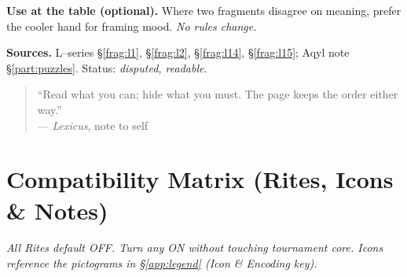\documentclass[11pt]{article}
\numberwithin{equation}{section} %
\theoremstyle{plain} %
\theoremstyle{definition} %
\theoremstyle{remark} %
\begin{document}
\medskip
\noindent\textbf{Use at the table (optional).} Where two fragments disagree on meaning, prefer the cooler hand for framing mood. \emph{No rules change.}

\medskip
\noindent\textbf{Sources.} L–series \S\ref{frag:l1}, \S\ref{frag:l2}, \S\ref{frag:l14}, \S\ref{frag:l15}; Aqyl note \S\ref{part:puzzles}. Status: \emph{disputed, readable}.


\begin{quote}\small
“Read what you can; hide what you must. The page keeps the order either way.”\\
\hfill — \textit{Lexicus}, note to self
\end{quote}
\clearpage
\appendix

\section{Compatibility Matrix (Rites, Icons \& Notes)}
\label{app:compat}

\noindent\textit{All Rites default \textsc{OFF}. Turn any \textsc{ON} without touching tournament core. Icons reference the pictograms in \S\ref{app:legend} (Icon \& Encoding key).}
\end{document}
